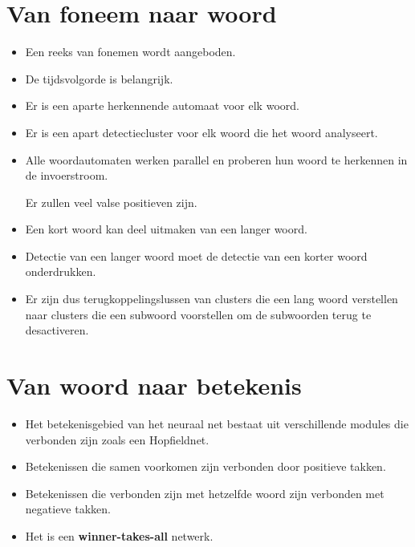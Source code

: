 \section{Van foneem naar woord}
\begin{itemize}
    \item Een reeks van fonemen wordt aangeboden.
    \item De tijdsvolgorde is belangrijk.
    \item Er is een aparte herkennende automaat voor elk woord.
    \item Er is een apart detectiecluster voor elk woord die het woord analyseert.
    \item Alle woordautomaten werken parallel en proberen hun woord te herkennen in de invoerstroom.
    \begin{itemize}
        \alert Er zullen veel valse positieven zijn.
    \end{itemize}
    \item Een kort woord kan deel uitmaken van een langer woord.
    \item Detectie van een langer woord moet de detectie van een korter woord onderdrukken.
    \item Er zijn dus terugkoppelingslussen van clusters die een lang woord verstellen naar clusters die een subwoord voorstellen om de subwoorden terug te desactiveren.
\end{itemize}

\section{Van woord naar betekenis}
\begin{itemize}
    \item Het betekenisgebied van het neuraal net bestaat uit verschillende modules die verbonden zijn zoals een Hopfieldnet.
    \item Betekenissen die samen voorkomen zijn verbonden door positieve takken. 
    \item Betekenissen die verbonden zijn met hetzelfde woord zijn verbonden met negatieve takken.
    \item Het is een \textbf{winner-takes-all} netwerk.
\end{itemize}

